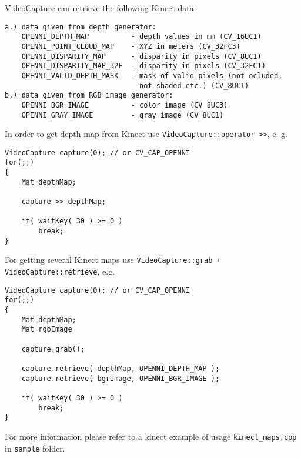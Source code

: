 VideoCapture can retrieve the following Kinect data:
\begin{lstlisting}
a.) data given from depth generator:
	OPENNI_DEPTH_MAP          - depth values in mm (CV_16UC1)
	OPENNI_POINT_CLOUD_MAP    - XYZ in meters (CV_32FC3)
	OPENNI_DISPARITY_MAP      - disparity in pixels (CV_8UC1)
	OPENNI_DISPARITY_MAP_32F  - disparity in pixels (CV_32FC1)
	OPENNI_VALID_DEPTH_MASK   - mask of valid pixels (not ocluded,
                                not shaded etc.) (CV_8UC1)
b.) data given from RGB image generator:
	OPENNI_BGR_IMAGE          - color image (CV_8UC3)
	OPENNI_GRAY_IMAGE         - gray image (CV_8UC1)
\end{lstlisting}

In order to get depth map from Kinect use \texttt{VideoCapture::operator >>}, e. g.
\begin{lstlisting}
VideoCapture capture(0); // or CV_CAP_OPENNI
for(;;)
{
	Mat depthMap;
	
	capture >> depthMap;
	
	if( waitKey( 30 ) >= 0 )
		break;
}
\end{lstlisting}
For getting several Kinect maps use \texttt{VideoCapture::grab + VideoCapture::retrieve}, e.g.
\begin{lstlisting}
VideoCapture capture(0); // or CV_CAP_OPENNI
for(;;)
{
	Mat depthMap;
	Mat rgbImage
	
	capture.grab();
	
	capture.retrieve( depthMap, OPENNI_DEPTH_MAP );
	capture.retrieve( bgrImage, OPENNI_BGR_IMAGE );
	
	if( waitKey( 30 ) >= 0 )
		break;
}
\end{lstlisting}

For more information please refer to a kinect example of usage \texttt{kinect\_maps.cpp} in \texttt{sample} folder.

\fi
